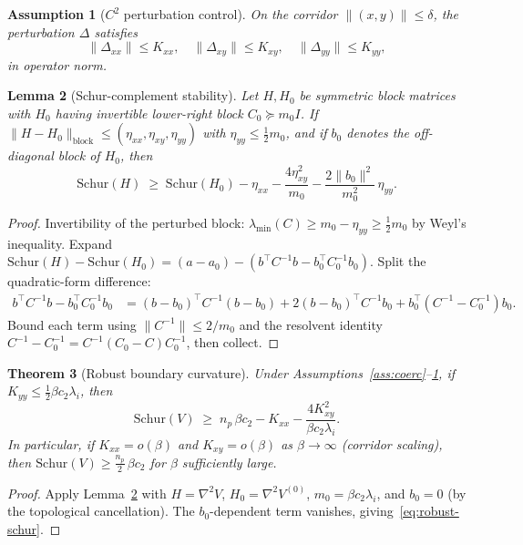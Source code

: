 \documentclass[11pt]{article}
\newtheorem{theorem}{Theorem}[section]
\newtheorem{lemma}[theorem]{Lemma}
\newtheorem{assumption}[theorem]{Assumption}
\theoremstyle{definition}
\newcommand{\1}{\mathbf{1}}
\newcommand{\norm}[1]{\lVert #1\rVert}
\begin{document}
\begin{assumption}[$C^2$ perturbation control]\label{ass:C2}
On the corridor $\norm{(x,y)}\le\delta$, the perturbation $\Delta$ satisfies
\[
\norm{\Delta_{xx}}\le K_{xx},\quad \norm{\Delta_{xy}}\le K_{xy},\quad \norm{\Delta_{yy}}\le K_{yy},
\]
in operator norm.
\end{assumption}

\begin{lemma}[Schur-complement stability]\label{lem:schur-stab}
Let $H, H_0$ be symmetric block matrices with $H_0$ having invertible lower-right block $C_0\succeq m_0 I$.
If $\norm{H-H_0}_{\mathrm{block}}\le(\eta_{xx},\eta_{xy},\eta_{yy})$ with $\eta_{yy}\le\frac{1}{2}m_0$,
and if $b_0$ denotes the off-diagonal block of $H_0$, then
\begin{equation}\label{eq:schur-stab}
\mathrm{Schur}(H) \;\ge\; \mathrm{Schur}(H_0)
- \eta_{xx} - \frac{4\eta_{xy}^2}{m_0} - \frac{2\norm{b_0}^2}{m_0^2}\,\eta_{yy}.
\end{equation}
\end{lemma}

\begin{proof}
Invertibility of the perturbed block: $\lambda_{\min}(C)\ge m_0-\eta_{yy}\ge\frac{1}{2}m_0$
by Weyl's inequality.  Expand $\mathrm{Schur}(H)-\mathrm{Schur}(H_0)=(a-a_0)-(b^\top C^{-1}b - b_0^\top C_0^{-1}b_0)$.
Split the quadratic-form difference:
\begin{align*}
b^\top C^{-1}b - b_0^\top C_0^{-1}b_0
&= (b-b_0)^\top C^{-1}(b-b_0) + 2(b-b_0)^\top C^{-1}b_0 + b_0^\top(C^{-1}-C_0^{-1})b_0.
\end{align*}
Bound each term using $\norm{C^{-1}}\le 2/m_0$ and the resolvent identity
$C^{-1}-C_0^{-1}=C^{-1}(C_0-C)C_0^{-1}$, then collect.
\end{proof}

\begin{theorem}[Robust boundary curvature]\label{thm:robust-schur}
Under Assumptions~\ref{ass:coerc}--\ref{ass:C2}, if $K_{yy}\le\frac{1}{2}\beta c_2\lambda_i$,
then
\begin{equation}\label{eq:robust-schur}
\mathrm{Schur}(V) \;\ge\; n_p\,\beta c_2 - K_{xx} - \frac{4K_{xy}^2}{\beta c_2\lambda_i}.
\end{equation}
In particular, if $K_{xx}=o(\beta)$ and $K_{xy}=o(\beta)$ as $\beta\to\infty$
(corridor scaling), then $\mathrm{Schur}(V)\ge\frac{n_p}{2}\,\beta c_2$ for $\beta$
sufficiently large.
\end{theorem}

\begin{proof}
Apply Lemma~\ref{lem:schur-stab} with $H=\nabla^2 V$, $H_0=\nabla^2 V^{(0)}$,
$m_0=\beta c_2\lambda_i$, and $b_0=0$ (by the topological cancellation).
The $b_0$-dependent term vanishes, giving~\eqref{eq:robust-schur}.
\end{proof}
\end{document}
